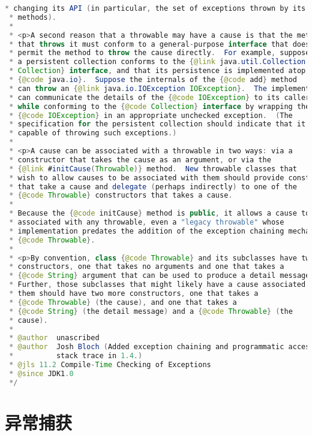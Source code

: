 \begin{lstlisting}[language=java]
 * changing its API (in particular, the set of exceptions thrown by its
 * methods).
 *
 * <p>A second reason that a throwable may have a cause is that the method
 * that throws it must conform to a general-purpose interface that does not
 * permit the method to throw the cause directly.  For example, suppose
 * a persistent collection conforms to the {@link java.util.Collection
 * Collection} interface, and that its persistence is implemented atop
 * {@code java.io}.  Suppose the internals of the {@code add} method
 * can throw an {@link java.io.IOException IOException}.  The implementation
 * can communicate the details of the {@code IOException} to its caller
 * while conforming to the {@code Collection} interface by wrapping the
 * {@code IOException} in an appropriate unchecked exception.  (The
 * specification for the persistent collection should indicate that it is
 * capable of throwing such exceptions.)
 *
 * <p>A cause can be associated with a throwable in two ways: via a
 * constructor that takes the cause as an argument, or via the
 * {@link #initCause(Throwable)} method.  New throwable classes that
 * wish to allow causes to be associated with them should provide constructors
 * that take a cause and delegate (perhaps indirectly) to one of the
 * {@code Throwable} constructors that takes a cause.
 *
 * Because the {@code initCause} method is public, it allows a cause to be
 * associated with any throwable, even a "legacy throwable" whose
 * implementation predates the addition of the exception chaining mechanism to
 * {@code Throwable}.
 *
 * <p>By convention, class {@code Throwable} and its subclasses have two
 * constructors, one that takes no arguments and one that takes a
 * {@code String} argument that can be used to produce a detail message.
 * Further, those subclasses that might likely have a cause associated with
 * them should have two more constructors, one that takes a
 * {@code Throwable} (the cause), and one that takes a
 * {@code String} (the detail message) and a {@code Throwable} (the
 * cause).
 *
 * @author  unascribed
 * @author  Josh Bloch (Added exception chaining and programmatic access to
 *          stack trace in 1.4.)
 * @jls 11.2 Compile-Time Checking of Exceptions
 * @since JDK1.0
 */

\end{lstlisting}




\section{异常捕获}

